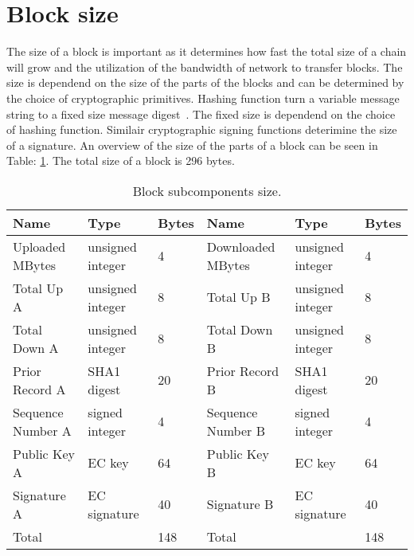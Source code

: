 \section{Block size}
The size of a block is important as it determines how fast the total size of a chain will grow
and the utilization of the bandwidth of network to transfer blocks.
The size is dependend on the size of the parts of the blocks
and can be determined by the choice of cryptographic primitives.
Hashing function turn a variable message string to a fixed size message digest~\cite{VanderLubbe-crypto}.
The fixed size is dependend on the choice of hashing function.
Similair cryptographic signing functions deterimine the size of a signature.
An overview of the size of the parts of a block can be seen in Table: \ref{table:block_size}.
The total size of a block is 296 bytes.

\begin{table}[]
\begin{adjustwidth}{-.5in}{-.5in}
\begin{center}
\begin{tabular}{lll||lll}
Name              & Type             & Bytes                   & Name              & Type             & Bytes \\ \hline
Uploaded MBytes   & unsigned integer & 4                       & Downloaded MBytes & unsigned integer & 4     \\
Total Up A        & unsigned integer & 8                       & Total Up B        & unsigned integer & 8     \\
Total Down A      & unsigned integer & 8                       & Total Down B      & unsigned integer & 8     \\
Prior Record A    & SHA1 digest      & 20                      & Prior Record B    & SHA1 digest      & 20    \\
Sequence Number A & signed integer   & 4                       & Sequence Number B & signed integer   & 4     \\
Public Key A      & EC key           & 64                      & Public Key B      & EC key           & 64    \\
Signature A       & EC signature     & 40                      & Signature B       & EC signature     & 40    \\ \hline
Total             &                  & 148                     & Total                  &                  & 148

\end{tabular}
\caption{Block subcomponents size.}
\label{table:block_size}
\end{center}
\end{adjustwidth}
\end{table}

